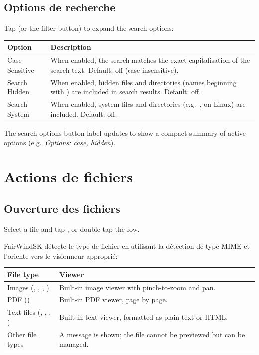\subsection{Options de recherche}

Tap  (or the filter button) to expand the search options:

\begin{longtable}{L{3.5cm} L{10.2cm}}
\toprule
{}
{\sffamily\bfseries\color{white} Option} &
{\sffamily\bfseries\color{white} Description} \\
\midrule
Case Sensitive & When enabled, the search matches the exact capitalisation of the search text. Default: off (case-insensitive). \\
Search Hidden & When enabled, hidden files and directories (names beginning with ) are included in search results. Default: off. \\
Search System & When enabled, system files and directories (e.g.\ ,  on Linux) are included. Default: off. \\
\bottomrule
\end{longtable}

The search options button label updates to show a compact summary of active options (e.g.\
\textit{Options: case, hidden}).

\section{Actions de fichiers}

\subsection{Ouverture des fichiers}

Select a file and tap , or double-tap the row.

FairWindSK détecte le type de fichier en utilisant la détection de type MIME et l'oriente vers le visionneur approprié:

\begin{longtable}{L{4cm} L{9.7cm}}
\toprule
{}
{\sffamily\bfseries\color{white} File type} &
{\sffamily\bfseries\color{white} Viewer} \\
\midrule
Images (, , , ) & Built-in image viewer with pinch-to-zoom and pan. \\
PDF (\code{.pdf}) & Built-in PDF viewer, page by page. \\
Text files (, , , ) & Built-in text viewer, formatted as plain text or HTML. \\
Other file types & A message is shown; the file cannot be previewed but can be managed. \\
\bottomrule
\end{longtable}

